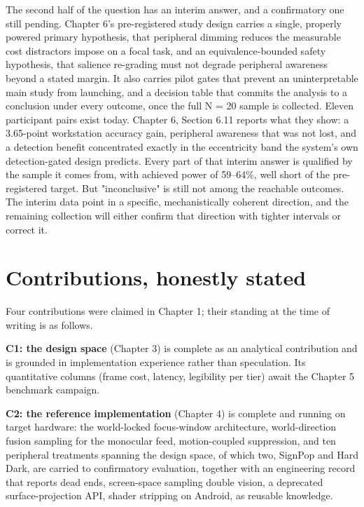 The second half of the question has an interim answer, and a confirmatory one still pending. Chapter
6's pre-registered study design carries a single, properly powered primary hypothesis, that peripheral
dimming reduces the measurable cost distractors impose on a focal task, and an equivalence-bounded
safety hypothesis, that salience re-grading must not degrade peripheral awareness beyond a stated
margin. It also carries pilot gates that prevent an uninterpretable main study from launching, and a
decision table that commits the analysis to a conclusion under every outcome, once the full N = 20
sample is collected. Eleven participant pairs exist today. Chapter 6, Section 6.11 reports what they
show: a 3.65-point workstation accuracy gain, peripheral awareness that was not lost, and a detection
benefit concentrated exactly in the eccentricity band the system's own detection-gated design
predicts. Every part of that interim answer is qualified by the sample it comes from, with achieved
power of 59–64\%, well short of the pre-registered target. But "inconclusive" is still not among the
reachable outcomes. The interim data point in a specific, mechanistically coherent direction, and the
remaining collection will either confirm that direction with tighter intervals or correct it.

\section{Contributions, honestly stated}

Four contributions were claimed in Chapter 1; their standing at the time of writing is as follows.

\textbf{C1: the design space} (Chapter 3) is complete as an analytical contribution and is grounded in
implementation experience rather than speculation. Its quantitative columns (frame cost, latency,
legibility per tier) await the Chapter 5 benchmark campaign.

\textbf{C2: the reference implementation} (Chapter 4) is complete and running on target hardware: the
world-locked focus-window architecture, world-direction fusion sampling for the monocular feed,
motion-coupled suppression, and ten peripheral treatments spanning the design space, of which two,
SignPop and Hard Dark, are carried to confirmatory evaluation, together with an engineering record
that reports dead ends, screen-space sampling double vision, a deprecated surface-projection API,
shader stripping on Android, as reusable knowledge.

